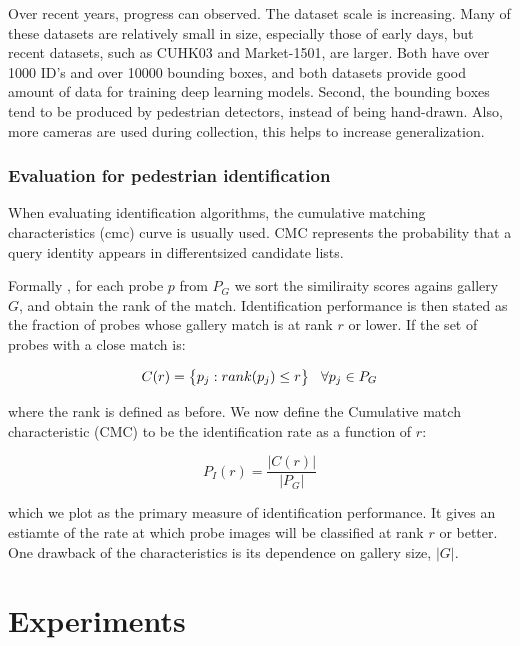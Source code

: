 \documentclass[12pt, a4paper, titlepage,twoside,openright]{article}
\newcommand\abs[1]{\left|#1\right|}
\begin{document}
Over recent years, progress can observed. The dataset scale is increasing. Many of these datasets are relatively small in size, especially those of early days, but recent datasets, such as CUHK03 and Market-1501, are larger. Both have over 1000 ID's and over 10000 bounding boxes, and both datasets provide good amount of data for training deep learning models. Second, the bounding boxes tend to be produced by pedestrian detectors, instead of being hand-drawn. Also, more cameras are used during collection, this helps to increase generalization.

\subsubsection{Evaluation for pedestrian identification}


When evaluating identification algorithms, the cumulative matching characteristics (cmc) curve is usually used. CMC represents the probability that a query identity appears in differentsized candidate lists.

Formally \cite{faceCMC}, for each probe $p$ from $P_{G}$ we sort the similiraity scores agains gallery $G$, and obtain the rank of the match. Identification performance is then stated as the fraction of probes whose gallery match is at rank $r$  or lower. If the set of probes with a close match is:

$$ C(r) = \big\{ p_{j}: rank(p_{j}) \leq r  \bigr\} \hspace{0.3cm} \forall p_{j} \in P_{G}  $$

where the rank is defined as before. We now define the Cumulative match characteristic (CMC) to be the identification rate as a function of $r$:

$$ P_{I}(r) = \dfrac{\abs{C(r)}}{\abs{P_{G}}} $$

which we plot as the primary measure of identification performance. It gives an estiamte of the rate at which probe images will be classified at rank $r$ or better. One drawback of the characteristics is its dependence on gallery size, $\abs{G}$.



\section{Experiments}
\end{document}
